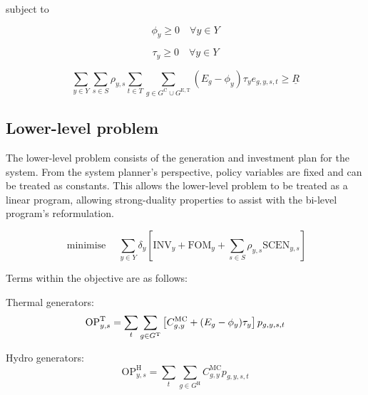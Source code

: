 \documentclass{article}
\newcommand{\sGeneratorsExistingThermal}{G^{\mathrm{E,T}}}
\newcommand{\sGeneratorsCandidate}{G^{\mathrm{C}}}
\newcommand{\sGeneratorsThermal}{G^{\mathrm{T}}}
\newcommand{\sGeneratorsHydro}{G^{\mathrm{H}}}
\newcommand{\sYears}{Y}
\newcommand{\sScenarios}{S}
\newcommand{\sIntervals}{T}
\newcommand{\iGenerator}{g}
\newcommand{\iYear}{y}
\newcommand{\iScenario}{s}
\newcommand{\iInterval}{t}
\newcommand{\cOperatingCostThermal}[1][\iYear,\iScenario]{\mathrm{OP}^{\mathrm{T}}_{#1}}
\newcommand{\cOperatingCostHydro}[1][\iYear,\iScenario]{\mathrm{OP}^{\mathrm{H}}_{#1}}
\newcommand{\cFixedOperationsMaintenanceCost}[1][\iYear]{\mathrm{FOM}_{#1}}
\newcommand{\cScenarioDuration}[1][\iYear,\iScenario]{\rho_{#1}}
\newcommand{\cMarginalCost}[1][\iGenerator,\iYear]{C^{\mathrm{MC}}_{#1}}
\newcommand{\cEmissionsIntensity}[1][\iGenerator]{E_{#1}}
\newcommand{\cInvestmentCost}[1][\iYear]{\mathrm{INV}_{#1}}
\newcommand{\cOperatingCostScenario}[1][\iYear,\iScenario]{\mathrm{SCEN}_{#1}}
\newcommand{\cDiscountRate}[1][\iYear]{\delta_{#1}}
\newcommand{\vBaseline}[1][\iYear]{\phi_{#1}}
\newcommand{\vPermitPrice}[1][\iYear]{\tau_{#1}}
\newcommand{\vEnergy}[1][\iGenerator,\iYear,\iScenario,\iInterval]{e_{#1}}
\newcommand{\vPower}[1][\iGenerator,\iYear,\iScenario,\iInterval]{p_{#1}}
\newcommand{\cMinimumSchemeRevenue}{\underline{R}}
\DeclareMathOperator*{\minimise}{minimise}
\begin{document}
subject to

\begin{equation}
	\vBaseline \geq 0 \quad \forall \iYear \in \sYears
\end{equation}

\begin{equation}
	\vPermitPrice \geq 0 \quad \forall \iYear \in \sYears
\end{equation}

\begin{equation}
	\sum\limits_{\iYear \in \sYears} \sum\limits_{\iScenario \in \sScenarios} \cScenarioDuration \sum\limits_{\iInterval \in \sIntervals} \sum\limits_{\iGenerator \in \sGeneratorsCandidate \cup \sGeneratorsExistingThermal}\left(\cEmissionsIntensity -\vBaseline\right)\vPermitPrice \vEnergy \geq \cMinimumSchemeRevenue
\end{equation}

\subsection{Lower-level problem}
The lower-level problem consists of the generation and investment plan for the system. From the system planner's perspective, policy variables are fixed and can be treated as constants. This allows the lower-level problem to be treated as a linear program, allowing strong-duality properties to assist with the bi-level program's reformulation.

\begin{equation}
	\minimise \quad \sum\limits_{\iYear\in\sYears} \cDiscountRate \left[\cInvestmentCost + \cFixedOperationsMaintenanceCost + \sum\limits_{\iScenario \in \sScenarios} \cScenarioDuration \cOperatingCostScenario \right]
\end{equation}

Terms within the objective are as follows:

Thermal generators:
\begin{equation}
	\cOperatingCostThermal = \sum\limits_{\iInterval} \sum\limits_{\iGenerator \in \sGeneratorsThermal} \left[\cMarginalCost + (\cEmissionsIntensity - \vBaseline)\vPermitPrice\right]\vPower\\
\end{equation}

Hydro generators:
\begin{equation}
	\cOperatingCostHydro = \sum\limits_{\iInterval}\sum\limits_{\iGenerator \in \sGeneratorsHydro}\cMarginalCost \vPower
\end{equation}
\end{document}
